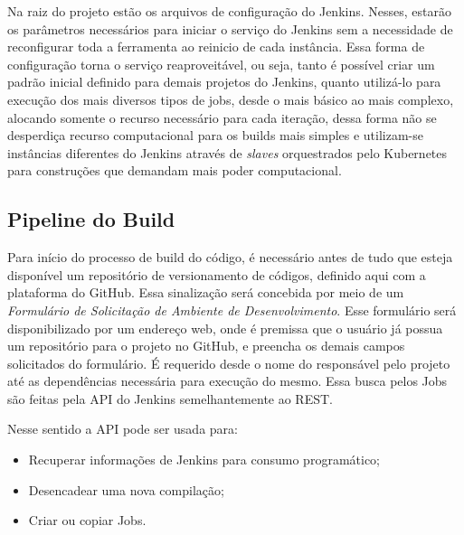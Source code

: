 Na raiz do projeto estão os arquivos de configuração do Jenkins. Nesses, estarão os parâmetros necessários para iniciar o serviço do Jenkins sem a necessidade de reconfigurar toda a ferramenta ao reinicio de cada instância. Essa forma de configuração torna o serviço reaproveitável, ou seja, tanto é possível criar um padrão inicial definido para demais projetos do Jenkins, quanto utilizá-lo para execução dos mais diversos tipos de jobs, desde o mais básico ao mais complexo, alocando somente o recurso necessário para cada iteração, dessa forma não se desperdiça recurso computacional para os builds mais simples e utilizam-se instâncias diferentes do Jenkins através de \textit{slaves} orquestrados pelo Kubernetes para construções que demandam mais poder computacional.
    \vspace*{0.5cm}

\subsection{Pipeline do Build}

Para início do processo de build do código, é necessário antes de tudo que esteja disponível um repositório de versionamento de códigos, definido aqui com a plataforma do GitHub. Essa sinalização será concebida por meio de um \textit{Formulário de Solicitação de Ambiente de Desenvolvimento}. Esse formulário será disponibilizado por um endereço web, onde é premissa que o usuário já possua um repositório para o projeto no GitHub, e preencha os demais campos solicitados do formulário. É requerido desde o nome do responsável pelo projeto até as dependências necessária para execução do mesmo. Essa busca pelos Jobs são feitas pela API do Jenkins semelhantemente ao REST.

Nesse sentido a API pode ser usada para:

\begin{itemize}
	\item Recuperar informações de Jenkins para consumo programático;
	\item Desencadear uma nova compilação;
	\item Criar ou copiar Jobs.
\end{itemize}


